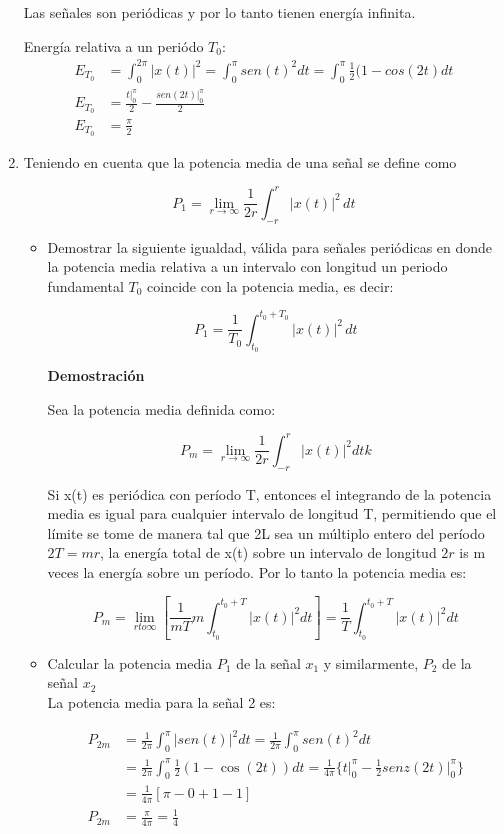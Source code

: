 \documentclass[12pt,a4paper]{report}
\begin{document}
\begin{enumerate}[label=\alph*),left=0pt]
    Las señales son periódicas y por lo tanto tienen energía infinita. 

    Energía relativa a un periódo $T_0$:
    $$
    \begin{aligned}
      E_{T_{0}}&=\int_0^{2\pi}|x(t)|^2=\int _0^\pi sen(t)^2dt=\int_0^\pi \frac{1}{2}(1-cos(2t) dt\\
            E_{T_0}&=\frac{t|^\pi_0}{2}-\frac{sen(2t)|^\pi_0}{2}\\
      E_{T_0}&=\frac{\pi}{2}
    \end{aligned}
    $$

  \item Teniendo en cuenta que la potencia media de una señal se define como

    $$P_1 = \lim_{r \to \infty} \frac{1}{2r} \int_{-r}^{r} |x(t)|^2 \, dt$$

    \begin{itemize}[left=0pt]
      \item Demostrar la siguiente igualdad, válida para señales periódicas en donde la potencia media relativa a un
        intervalo con longitud un periodo fundamental $T_0$ coincide con la potencia media, es decir:

         $$P_1 = \frac{1}{T_0} \int_{t_0}^{t_0 + T_0} |x(t)|^2 \, dt$$

        \textbf{Demostración}

        Sea la potencia media definida como:

        $$P_m=\lim _{r \to \infty} \frac{1}{2r}\int_{-r}^{r}|x(t)|^2dtk$$

        Si x(t) es periódica con período T, entonces el integrando de la potencia media es igual
        para cualquier intervalo de longitud T, permitiendo que el límite se tome de manera tal 
        que 2L sea un múltiplo entero del período  $2T=mr$, la energía total de x(t) sobre un intervalo de longitud $2r$ is m veces la energía sobre un período. Por lo tanto la potencia media es:

        $$P_m=\lim_{r to \infty}[\frac{1}{mT}m\int_{t_0}^{t_0+T} |x(t)|^2 dt]=\frac{1}{T}\int_{t_0}^{t_0+T} |x(t)|^2 dt$$

      \item Calcular la potencia media $P_1$ de la señal $x_1$ y similarmente, $P_2$ de la señal $x_2$\\
        La potencia media para la señal 2 es:

        $$
        \begin{aligned}
        P_{2m}&=\frac{1}{2\pi}\int_0^{\pi}|sen(t)|^2dt
        =\frac{1}{2\pi}\int_0^{\pi}sen(t)^2dt\\
        &=\frac{1}{2\pi}\int_0^{\pi}\frac{1}{2}(1-\cos (2t))dt
        =\frac{1}{4\pi}\{t\vert_0^\pi-\frac{1}{2}senz(2t)\vert_0^\pi\}\\
        &=\frac{1}{4\pi}[\pi-0+1-1]\\
        P_{2m}&=\frac{\pi}{4\pi}
        =\frac{1}{4}
        \end{aligned}
        $$


\end{itemize}
\end{enumerate}
\end{document}
